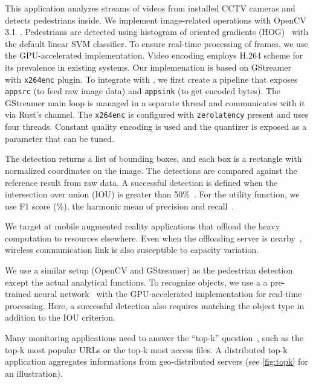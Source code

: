  This application analyzes streams of videos from
installed CCTV cameras and detects pedestrians inside. We implement
image-related operations with OpenCV 3.1~\cite{opencvlibrary}. Pedestrians are
detected using histogram of oriented gradients (HOG)~\cite{dalal2005histograms}
with the default linear SVM classifier. To ensure real-time processing of
frames, we use the GPU-accelerated implementation. Video encoding employs H.264
scheme for its prevalence in existing systems. Our implemenation is based on
GStreamer~\cite{gstreamer} with \texttt{x264enc} plugin. To integrate with
\sysname{}, we first create a pipeline that exposes \texttt{appsrc} (to feed raw
image data) and \texttt{appsink} (to get encoded bytes). The GStreamer main loop
is managed in a separate thread and \sysname{} communicates with it via Rust's
channel. The \texttt{x264enc} is configured with \texttt{zerolatency} present
and uses four threads. Constant quality encoding is used and the quantizer is
exposed as a parameter that can be tuned.

The detection returns a list of bounding boxes, and each box is a rectangle with
normalized coordinates on the image. The detections are compared against the
reference result from raw data. A successful detection is defined when the
intersection over union (IOU) is greater than
50\%~\cite{everingham2010pascal}. For the utility function, we use F1 score
(\%), the harmonic mean of precision and
recall~\cite{Rijsbergen:1979:IR:539927}.

 We target at mobile augmented reality applications
that offload the heavy computation to resources elsewhere. Even when the
offloading server is nearby~\cite{satyanarayanan2009case, zhang2015cloud},
wireless communication link is also susceptible to capacity variation.

We use a similar setup (OpenCV and GStreamer) as the pedestrian detection except
the actual analytical functions. To recognize objects, we use a a pre-trained
neural network~\cite{darknet13} with the GPU-accelerated implementation for
real-time processing. Here, a successful detection also requires matching the
object type in addition to the IOU criterion.

 Many monitoring applications need to answer the
``top-k'' question~\cite{babcock2003distributed}, such as the top-k most popular
URLs or the top-k most access files. A distributed top-k application aggregates
informations from geo-distributed servers (see \autoref{fig:topk} for an
illustration).

